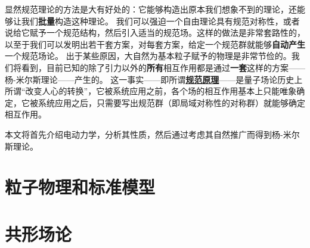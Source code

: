\documentclass[hyperref, UTF8, a4paper]{ctexbook}
\newcommand{\concept}[1]{\underline{\textbf{#1}}}
\renewcommand{\emph}{\textbf}
\begin{document}
显然规范理论的方法是大有好处的：它能够构造出原本我们想象不到的理论，还能够让我们\emph{批量}构造这种理论。
我们可以强迫一个自由理论具有规范对称性，或者说给它赋予一个规范结构，然后引入适当的规范场。这样的做法是非常套路性的，以至于我们可以发明出若干套方案，对每套方案，给定一个规范群就能够\emph{自动产生}一个规范场论。
出于某些原因，大自然为基本粒子赋予的物理是非常节俭的。我们将看到，目前已知的除了引力以外的\emph{所有}相互作用都是通过\emph{一套}这样的方案——杨-米尔斯理论——产生的。
这一事实——即所谓\concept{规范原理}——是量子场论历史上所谓“改变人心的转换”，它被系统应用之前，各个场的相互作用基本上只能唯象确定，它被系统应用之后，只需要写出规范群（即局域对称性的对称群）就能够确定相互作用。

本文将首先介绍电动力学，分析其性质，然后通过考虑其自然推广而得到杨-米尔斯理论。







\part{粒子物理和标准模型}

\part{共形场论}




 
\end{document}
